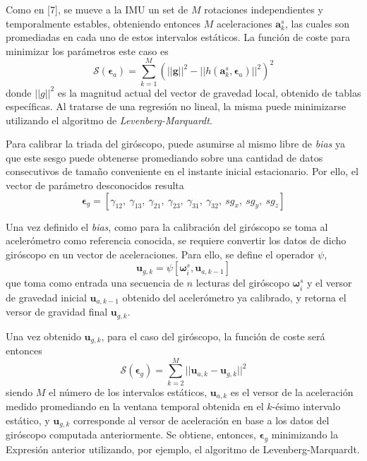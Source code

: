 Como en [7], se mueve a la IMU un set de $M$ rotaciones independientes y temporalmente estables, obteniendo entonces $M$ aceleraciones $\bm{a}^s_k$, las cuales son promediadas en cada uno de estos intervalos estáticos. La función de coste para minimizar los parámetros este caso es
\begin{equation}
    \mathscr{S}(\bm{\epsilon}_{a}) = \sum_{k=1}^M(||\bm{g}||^2-||h(\bm{a}^s_k,\bm{\epsilon}_{a})||^2)^2
\end{equation}
donde $||g||^2$ es la magnitud actual del vector de gravedad local, obtenido de tablas específicas. Al tratarse de una regresión no lineal, la misma puede minimizarse utilizando el algoritmo de \textit{Levenberg-Marquardt}.

Para calibrar la triada del giróscopo, puede asumirse al mismo libre de \textit{bias} ya que este sesgo puede obtenerse promediando sobre una cantidad de datos consecutivos de tamaño conveniente en el instante inicial estacionario. Por ello, el vector de parámetro desconocidos resulta
\begin{equation}
    \bm{\epsilon}_{g} = \left[\gamma_{12},\ \gamma_{13},\ \gamma_{21},\ \gamma_{23},\ \gamma_{31},\ \gamma_{32},\ sg_x,\ sg_y,\ sg_z\right]
\end{equation}

Una vez definido el \textit{bias}, como para la calibración del giróscopo se toma al acelerómetro como referencia conocida, se requiere convertir los datos de dicho giróscopo en un vector de aceleraciones. Para ello, se define el operador $\psi$, 
\begin{equation}
    \bm{u}_{g,k} = \psi\left[\bm{\omega}_i^s,\bm{u}_{a,k-1}\right]
\end{equation}
que toma como entrada una secuencia de $n$ lecturas del giróscopo $\bm{\omega}_i^s$ y el versor de gravedad inicial $\bm{u}_{a,k-1}$ obtenido del acelerómetro ya calibrado, y retorna el versor de gravidad final $\bm{u}_{g,k}$. 

Una vez obtenido $\bm{u}_{g,k}$, para el caso del giróscopo, la función de coste será entonces
\begin{equation}
    \mathscr{S}(\bm{\epsilon}_{g}) = \sum_{k=2}^M ||\bm{u}_{a,k} - \bm{u}_{g,k}||^2
\end{equation}
siendo $M$ el número de los intervalos estáticos, $\bm{u}_{a,k}$ es el versor de la aceleración medido promediando en la ventana temporal obtenida en el $k$-ésimo intervalo estático, y $\bm{u}_{g,k}$ corresponde al versor de aceleración en base a los datos del giróscopo computada anteriormente. Se obtiene, entonces, $\bm{\epsilon}_{g}$ minimizando la Expresión anterior utilizando, por ejemplo, el algoritmo de Levenberg-Marquardt.

